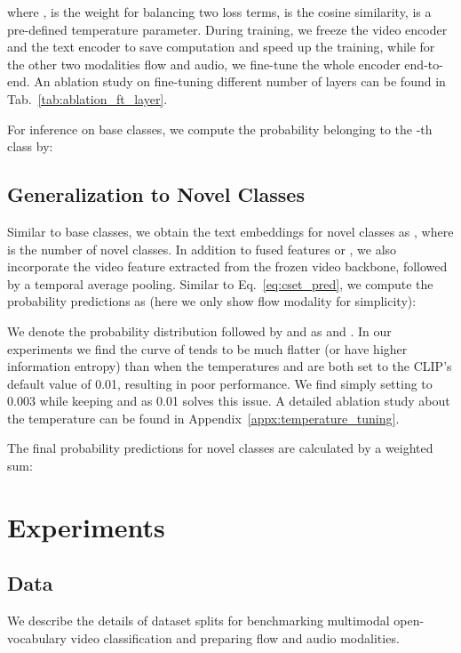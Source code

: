\documentclass{article}
\begin{document}
where ,  is the weight for balancing two loss terms,  is the cosine similarity,  is a pre-defined temperature parameter.  
During training, we freeze the video encoder and the text encoder to save computation and speed up the training, while for the other two modalities flow and audio, we fine-tune the whole encoder end-to-end. 
An ablation study on fine-tuning different number of layers can be found in Tab.~\ref{tab:ablation_ft_layer}.

For inference on base classes, we compute the probability belonging to the -th class by:




\subsection{Generalization to Novel Classes}
\label{subsec:openset}
Similar to base classes, we obtain the text embeddings for novel classes as , where  is the number of novel classes. 
In addition to fused features  or , we also incorporate the video feature  extracted from the frozen video backbone, followed by a temporal average pooling. Similar to Eq.~\ref{eq:cset_pred}, we compute the probability predictions as (here we only show flow modality for simplicity): 

We denote the probability distribution followed by  and  as  and . 
In our experiments we find the curve of  tends to be much flatter (or have higher information entropy) than  when the temperatures  and  are both set to the CLIP's default value of 0.01, resulting in poor performance.
We find simply setting  to 0.003 while keeping  and  as 0.01 solves this issue.
A detailed ablation study about the temperature can be found in Appendix~\ref{appx:temperature_tuning}.

The final probability predictions for novel classes are calculated by a weighted sum:



\section{Experiments}
\label{sec:experiments}

\subsection{Data}
\label{subsec:data_prep}

We describe the details of dataset splits for benchmarking multimodal open-vocabulary video classification and preparing flow and audio modalities. 
\end{document}
